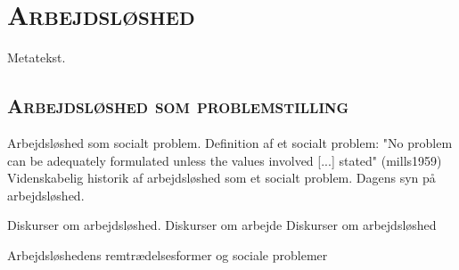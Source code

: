
\newpage \section{\textsc{Arbejdsløshed \label{}}}

Metatekst.

\subsection{\textsc{Arbejdsløshed som problemstilling}}

Arbejdsløshed som socialt problem. %
	Definition af et socialt problem: "No problem can be adequately formulated unless the values involved [...] stated" (mills1959)
	Videnskabelig historik af arbejdsløshed som et socialt problem.
	Dagens syn på arbejdsløshed.

Diskurser om arbejdsløshed. %
	Diskurser om arbejde
	Diskurser om arbejdsløshed

Arbejdsløshedens remtrædelsesformer og sociale problemer %



